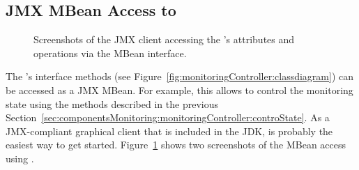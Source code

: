 \subsection{JMX MBean Access to }

\begin{figure}\centering
{}
\caption{Screenshots of the  JMX client accessing the 's %
attributes and operations via the MBean interface. %
}
\label{fig:monitoringController:MBean:jconsole}
\end{figure}

The 's %
interface methods (see Figure~\ref{fig:monitoringController:classdiagram}) can be accessed %
as a JMX MBean. For example, this allows to control the monitoring state using %
the methods described in the previous Section~\ref{sec:componentsMonitoring:monitoringController:controState}. %
As a JMX-compliant graphical client that is included in the JDK,  %
is probably the easiest way to get started. Figure~\ref{fig:monitoringController:MBean:jconsole} %
shows two screenshots of the MBean access using .

